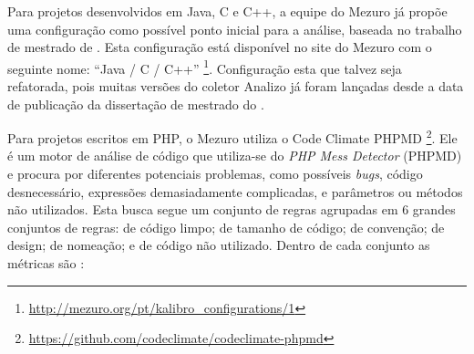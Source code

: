 Para projetos desenvolvidos em Java, C e C++, a equipe do Mezuro já propõe
uma configuração como possível ponto inicial para a análise, baseada no trabalho
de mestrado de . Esta configuração está disponível no site do
Mezuro com o seguinte nome: ``Java / C / C++''
\footnote{\url{http://mezuro.org/pt/kalibro_configurations/1}}. Configuração
esta que talvez seja refatorada, pois muitas versões do coletor Analizo já foram
lançadas desde a data de publicação da dissertação de mestrado do
.

Para projetos escritos em PHP, o Mezuro utiliza o Code Climate PHPMD
\footnote{\url{https://github.com/codeclimate/codeclimate-phpmd}}.
Ele é um motor de análise de código que utiliza-se do \textit{PHP Mess Detector}
(PHPMD) e procura por diferentes potenciais problemas, como possíveis \textit{bugs},
código desnecessário, expressões demasiadamente complicadas, e parâmetros ou
métodos não utilizados. Esta busca segue um conjunto de regras agrupadas em 6
grandes conjuntos de regras: de código limpo; de tamanho de código; de
convenção; de design; de nomeação; e de código não utilizado. Dentro de cada
conjunto as métricas são \cite{PichlerPHPMD}:

